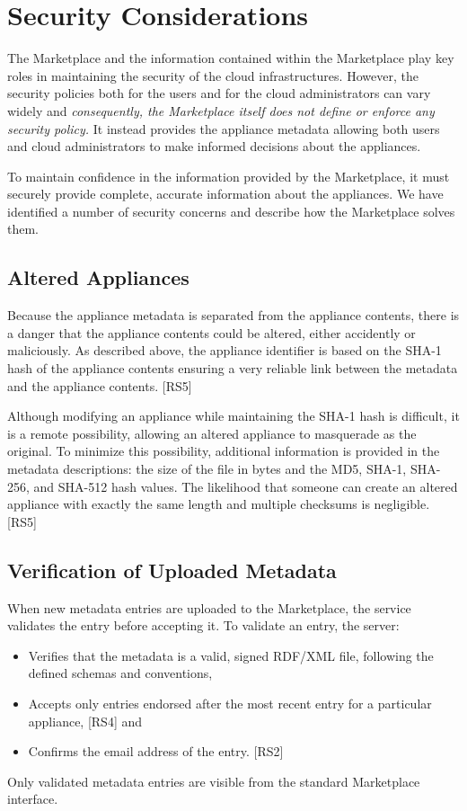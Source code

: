 \section{Security Considerations}
\label{sec:security}

The Marketplace and the information contained within the Marketplace
play key roles in maintaining the security of the cloud
infrastructures.  However, the security policies both for the users
and for the cloud administrators can vary widely and {\em
  consequently, the Marketplace itself does not define or enforce any
  security policy.}  It instead provides the appliance metadata
allowing both users and cloud administrators to make informed
decisions about the appliances.

To maintain confidence in the information provided by the Marketplace,
it must securely provide complete, accurate information about the
appliances.  We have identified a number of security concerns and
describe how the Marketplace solves them. 

\subsection{Altered Appliances}

Because the appliance metadata is separated from the appliance
contents, there is a danger that the appliance contents could be
altered, either accidently or maliciously.  As described above, the
appliance identifier is based on the SHA-1 hash of the appliance
contents ensuring a very reliable link between the metadata and the
appliance contents. [RS5]

Although modifying an appliance while maintaining the SHA-1 hash is
difficult, it is a remote possibility, allowing an altered appliance
to masquerade as the original.  To minimize this possibility,
additional information is provided in the metadata descriptions: the
size of the file in bytes and the MD5, SHA-1, SHA-256, and SHA-512
hash values.  The likelihood that someone can create an altered
appliance with exactly the same length and multiple checksums is
negligible. [RS5]

\subsection{Verification of Uploaded Metadata}

When new metadata entries are uploaded to the Marketplace, the service
validates the entry before accepting it.  To validate an entry, the
server:
\begin{itemize}
\item Verifies that the metadata is a valid, signed RDF/XML file,
  following the defined schemas and conventions,
\item Accepts only entries endorsed after the most recent entry for a
  particular appliance, [RS4] and 
\item Confirms the email address of the entry. [RS2]
\end{itemize}
Only validated metadata entries are visible from the standard
Marketplace interface.

